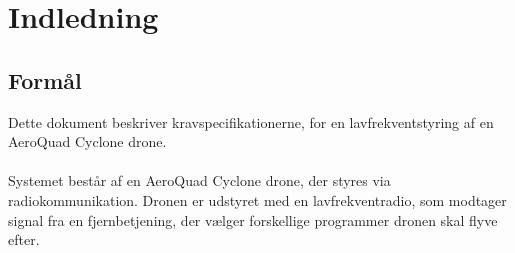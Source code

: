 \documentclass[Main]{subfiles}
\begin{document}
\chapter{Indledning}

\section{Formål}

Dette dokument beskriver kravspecifikationerne, for en lavfrekventstyring af en AeroQuad Cyclone drone.
\\
\\
Systemet består af en AeroQuad Cyclone drone, der styres via radiokommunikation.
Dronen er udstyret med en lavfrekventradio, som modtager signal fra en fjernbetjening, der vælger forskellige programmer dronen skal flyve efter.


\end{document}
